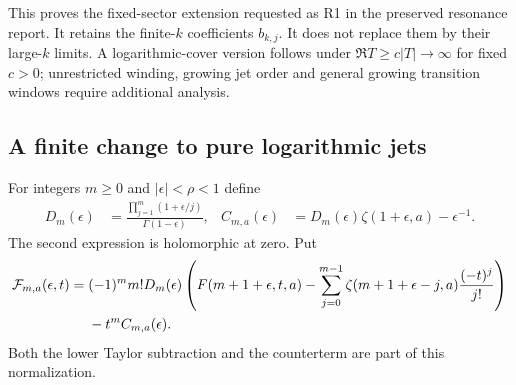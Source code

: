 This proves the fixed-sector extension requested as R1 in the preserved
resonance report. It retains the finite-$k$ coefficients $b_{k,j}$.
It does not replace them by their large-$k$ limits. A logarithmic-cover
version follows under $\Re T\ge c|T|\to\infty$ for fixed $c>0$;
unrestricted winding, growing jet order and general growing transition
windows require additional analysis.

\subsection{A finite change to pure logarithmic jets}
For integers $m\ge0$ and $|\epsilon|<\rho<1$ define
\begin{align}
 D_m(\epsilon)&=\frac{\prod_{j=1}^m(1+\epsilon/j)}
                         {\Gamma(1-\epsilon)},&
 C_{m,a}(\epsilon)&=D_m(\epsilon)\zeta(1+\epsilon,a)-\epsilon^{-1}.
 \label{rj:normalizer}
\end{align}
The second expression is holomorphic at zero. Put
\begin{align}
 \mathcal F_{m,a}(\epsilon,t)
 ={}&(-1)^m m!D_m(\epsilon)
 \left(F(m+1+\epsilon,t,a)
 -\sum_{j=0}^{m-1}\zeta(m+1+\epsilon-j,a)\frac{(-t)^j}{j!}\right)
 \notag\\
 &-t^m C_{m,a}(\epsilon).\label{rj:normalized-family}
\end{align}
Both the lower Taylor subtraction and the counterterm are part of this
normalization.

